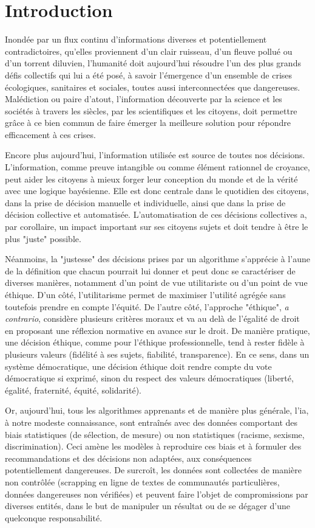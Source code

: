 \section{Introduction}

Inondée par un flux continu d'informations diverses et potentiellement contradictoires, qu'elles proviennent d'un clair ruisseau, d'un fleuve pollué ou d'un torrent diluvien, l'humanité doit aujourd'hui résoudre l'un des plus grands défis collectifs qui lui a été posé, à savoir l'émergence d'un ensemble de crises écologiques, sanitaires et sociales, toutes aussi interconnectées que dangereuses. Malédiction ou paire d'atout, l'information découverte par la science et les sociétés à travers les siècles, par les scientifiques et les citoyens, doit permettre grâce à ce bien commun de faire émerger la meilleure solution pour répondre efficacement à ces crises. 

Encore plus aujourd'hui, l'information utilisée est source de toutes nos décisions. L'information, comme preuve intangible ou comme élément rationnel de croyance, peut aider les citoyens à mieux forger leur conception du monde et de la vérité avec une logique bayésienne. Elle est donc centrale dans le quotidien des citoyens, dans la prise de décision manuelle et individuelle, ainsi que dans la prise de décision collective et automatisée. L'automatisation de ces décisions collectives a, par corollaire, un impact important sur ses citoyens sujets et doit tendre à être le plus "juste" possible.

Néanmoins, la "justesse" des décisions prises par un algorithme s'apprécie à l'aune de la définition que chacun pourrait lui donner et peut donc se caractériser de diverses manières, notamment d'un point de vue utilitariste ou d'un point de vue éthique. D'un côté, l'utilitarisme permet de maximiser l'utilité agrégée sans toutefois prendre en compte l'équité. De l'autre côté, l'approche "éthique", \textit{a contrario}, considère plusieurs critères moraux et va au delà de l'égalité de droit en proposant une réflexion normative en avance sur le droit. De manière pratique, une décision éthique, comme pour l'éthique professionnelle, tend à rester fidèle à plusieurs valeurs (fidélité à ses sujets, fiabilité, transparence). En ce sens, dans un système démocratique, une décision éthique doit rendre compte du vote démocratique si exprimé, sinon du respect des valeurs démocratiques (liberté, égalité, fraternité, équité, solidarité).

Or, aujourd'hui, tous les algorithmes apprenants et de manière plus générale, l'\gls{ia}, à notre modeste connaissance, sont entraînés avec des données comportant des biais statistiques (de sélection, de mesure) ou non statistiques (racisme, sexisme, discrimination). Ceci amène les modèles à reproduire ces biais et à formuler des recommandations et des décisions non adaptées, aux conséquences potentiellement dangereuses. De surcroît, les données sont collectées de manière non contrôlée (scrapping en ligne de textes de communautés particulières, données dangereuses non vérifiées) et peuvent faire l'objet de compromissions par diverses entités, dans le but de manipuler un résultat ou de se dégager d'une quelconque responsabilité.

